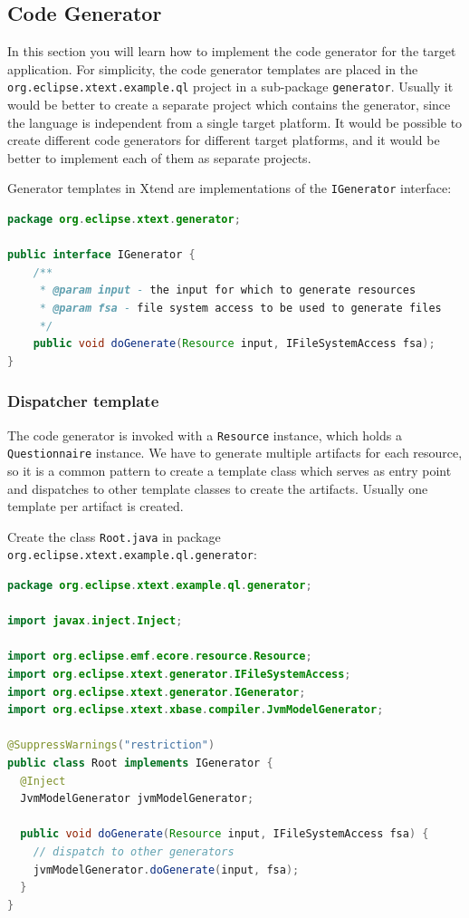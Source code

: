 \subsection{Code Generator}

In this section you will learn how to implement the code generator for 
the target application. For simplicity, the code generator templates are placed
in the \texttt{org.eclipse.xtext.example.ql} project in a sub-package \texttt{generator}. 
Usually it would be better to create a separate project which contains the generator,
since the language is independent from a single target platform. It would
be possible to create different code generators for different target platforms,
and it would be better to implement each of them as separate projects.

Generator templates in Xtend are implementations of the \texttt{IGenerator}
interface:

\begin{lstlisting}[language=Java]
package org.eclipse.xtext.generator;

public interface IGenerator {
	/**
	 * @param input - the input for which to generate resources
	 * @param fsa - file system access to be used to generate files
	 */
	public void doGenerate(Resource input, IFileSystemAccess fsa);
}
\end{lstlisting}

\subsubsection {Dispatcher template}
\label{sec:dispatcherTemplate}

The code generator is invoked with a \texttt{Resource} instance, which holds a \texttt{Questionnaire}
instance. We have to generate multiple artifacts for each resource, so it is a common 
pattern to create a template class which serves as entry point and dispatches to other
template classes to create the artifacts. Usually one template per artifact is
created.

Create the class \texttt{Root.java} in 
package \texttt{org.eclipse.xtext.example.ql.generator}:

\begin{lstlisting}[language=Java]
package org.eclipse.xtext.example.ql.generator;

import javax.inject.Inject;

import org.eclipse.emf.ecore.resource.Resource;
import org.eclipse.xtext.generator.IFileSystemAccess;
import org.eclipse.xtext.generator.IGenerator;
import org.eclipse.xtext.xbase.compiler.JvmModelGenerator;

@SuppressWarnings("restriction")
public class Root implements IGenerator {
  @Inject
  JvmModelGenerator jvmModelGenerator;

  public void doGenerate(Resource input, IFileSystemAccess fsa) {
    // dispatch to other generators
    jvmModelGenerator.doGenerate(input, fsa);
  }
}
\end{lstlisting}


